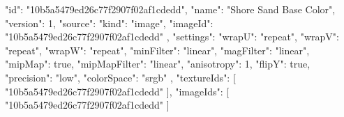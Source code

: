 {
  "id": "10b5a5479ed26c77f2907f02af1cdedd",
  "name": "Shore Sand Base Color",
  "version": 1,
  "source": {
    "kind": "image",
    "imageId": "10b5a5479ed26c77f2907f02af1cdedd"
  },
  "settings": {
    "wrapU": "repeat",
    "wrapV": "repeat",
    "wrapW": "repeat",
    "minFilter": "linear",
    "magFilter": "linear",
    "mipMap": true,
    "mipMapFilter": "linear",
    "anisotropy": 1,
    "flipY": true,
    "precision": "low",
    "colorSpace": "srgb"
  },
  "textureIds": [
    "10b5a5479ed26c77f2907f02af1cdedd"
  ],
  "imageIds": [
    "10b5a5479ed26c77f2907f02af1cdedd"
  ]
}

